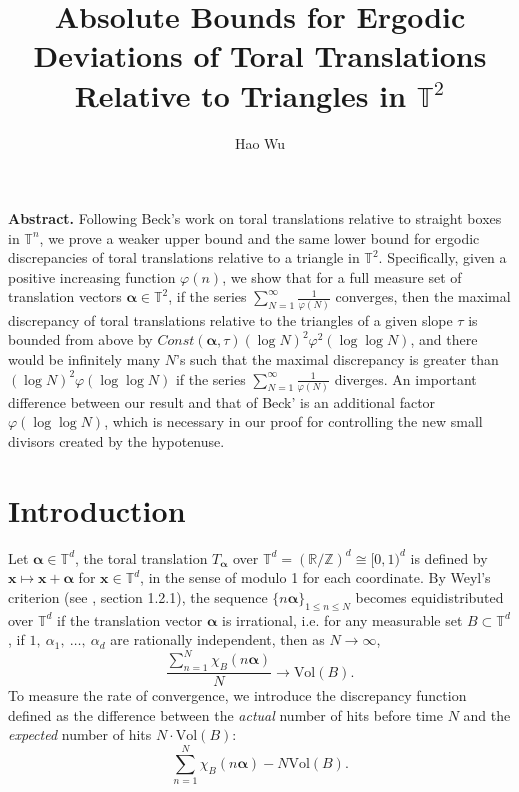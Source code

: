 \documentclass[11pt]{article}
\title{Absolute Bounds for Ergodic Deviations of Toral Translations Relative to Triangles in $\mathbb{T}^2$}
\author{Hao Wu}
\date{}
\newcommand{\fc}{\frac}
\newcommand{\Z}{\mathbb{Z}}
\newcommand{\T}{\mathbb{T}}
\newcommand{\R}{\mathbb{R}}
\renewcommand{\a}{\alpha}
\renewcommand{\(}{\left(}
\renewcommand{\)}{\right)}
\renewcommand{\bf}{\mathbf}
\newcommand{\Vol}{\text{Vol}}
\newcommand{\bma}{\bm{\alpha}}
\newcommand{\<}{\langle}
\renewcommand{\>}{\rangle}
\begin{document}
\maketitle
\textbf{Abstract.} Following Beck's work on toral translations relative to straight boxes in $\T^n$, we prove a weaker upper bound and the same lower bound for ergodic discrepancies of toral translations relative to a triangle in $\T^2$. Specifically, given a positive increasing function $\varphi(n)$, we show that for a full measure set of translation vectors $\bm{\a}\in \T^2$, if the series $\sum_{N=1}^{\infty} \fc{1}{\varphi (N)} $ converges, then the maximal discrepancy of toral translations relative to the triangles of a given slope $\tau$ is bounded from above by $Const(\bma,\tau) (\log N)^2 \varphi^2(\log \log N)$, and there would be infinitely many $N$'s such that the maximal discrepancy is greater than $(\log N)^2\varphi(\log \log N)$ if the series $\sum_{N=1}^{\infty} \fc{1}{\varphi (N)} $ diverges. An important difference between our result and that of Beck' is an additional factor $\varphi(\log \log N)$, which is necessary in our proof for controlling the new small divisors created by the hypotenuse.



\clearpage
\tableofcontents
\clearpage
\section{Introduction}
Let $\bma\in \T^d$, the toral translation $T_{\bma}$ over $\T^d=(\R/\Z)^d\cong [0,1)^d$ is defined by $\bf{x}\mapsto \bf{x}+\bma$ for $\bf{x}\in \T^d$, in the sense of modulo 1 for each coordinate. By Weyl's criterion (see \cite{Drmota}, section 1.2.1), the sequence $\{n\bma\}_{1\le n\le N}$ becomes equidistributed over $\T^d$ if the translation vector $\bma$ is irrational, i.e. for any measurable set $B\subset \T^d$, if $1, \ \a_1,\ \dots, \ \a_d$ are rationally independent, then as $N\rightarrow \infty$,
$$
\fc{\sum_{n=1}^{N}\chi_{B}(n\bma)}{N}\rightarrow \Vol(B).
$$
To measure the rate of convergence, we introduce the discrepancy function defined as the difference between the \emph{actual} number of hits before time $N$ and the \emph{expected} number of hits $N\cdot \Vol(B)$:
$$\sum_{n=1}^{N}\chi_{B}(n\bma)-N\Vol(B).$$
\end{document}

